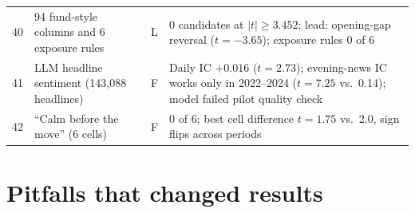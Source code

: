 \begin{longtable}{@{}r R{4.6cm} c p{8.4cm}@{}}
40 & 94 fund-style columns and 6 exposure rules & L & 0 candidates at $|t|\ge3.452$; lead: opening-gap reversal ($t=-3.65$); exposure rules 0 of 6 \\
41 & LLM headline sentiment (143,088 headlines) & F & Daily IC $+0.016$ ($t=2.73$); evening-news IC works only in 2022--2024 ($t=7.25$ vs.\ 0.14); model failed pilot quality check \\
42 & ``Calm before the move'' (6 cells) & F & 0 of 6; best cell difference $t=1.75$ vs.\ 2.0, sign flips across periods \\
\end{longtable}
\normalsize

\section{Pitfalls that changed results}\label{app:pitfalls}

